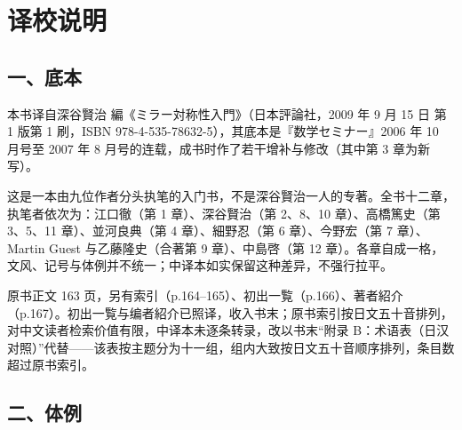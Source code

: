 \chapter*{译校说明}

\section*{一、底本}

本书译自深谷賢治 編《ミラー対称性入門》（日本評論社，2009 年 9 月 15 日 第 1 版第 1 刷，ISBN 978-4-535-78632-5），其底本是『数学セミナー』2006 年 10 月号至 2007 年 8 月号的连载，成书时作了若干增补与修改（其中第 3 章为新写）。

这是一本由九位作者分头执笔的入门书，不是深谷賢治一人的专著。全书十二章，执笔者依次为：江口徹（第 1 章）、深谷賢治（第 2、8、10 章）、高橋篤史（第 3、5、11 章）、並河良典（第 4 章）、細野忍（第 6 章）、今野宏（第 7 章）、Martin Guest 与乙藤隆史（合著第 9 章）、中島啓（第 12 章）。各章自成一格，文风、记号与体例并不统一；中译本如实保留这种差异，不强行拉平。

原书正文 163 页，另有索引（p.164–165）、初出一覧（p.166）、著者紹介（p.167）。初出一覧与编者紹介已照译，收入书末；原书索引按日文五十音排列，对中文读者检索价值有限，中译本未逐条转录，改以书末“附录 B：术语表（日汉对照）”代替——该表按主题分为十一组，组内大致按日文五十音顺序排列，条目数超过原书索引。

\section*{二、体例}

